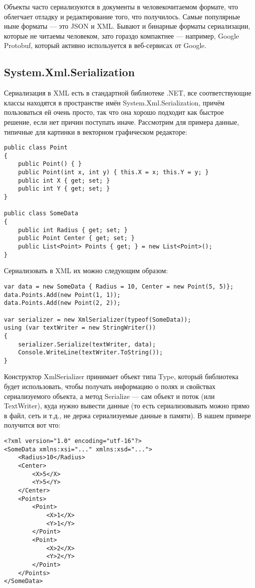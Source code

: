 \documentclass[a5paper]{article}
\begin{document}
Объекты часто сериализуются в документы в человекочитаемом формате, что облегчает отладку и редактирование того, что получилось. Самые популярные ныне форматы --- это JSON и XML. Бывают и бинарные форматы сериализации, которые не читаемы человеком, зато гораздо компактнее --- например, Google Protobuf, который активно используется в веб-сервисах от Google.

\subsection{System.Xml.Serialization}

Сериализация в XML есть в стандартной библиотеке .NET, все соответствующие классы находятся в пространстве имён System.Xml.Serialization, причём пользоваться ей очень просто, так что она хорошо подходит как быстрое решение, если нет причин поступать иначе. Рассмотрим для примера данные, типичные для картинки в векторном графическом редакторе:

\begin{verbatim}
public class Point
{
    public Point() { }
    public Point(int x, int y) { this.X = x; this.Y = y; }
    public int X { get; set; }
    public int Y { get; set; }
}

public class SomeData
{
    public int Radius { get; set; }
    public Point Center { get; set; }
    public List<Point> Points { get; } = new List<Point>();
}
\end{verbatim}

Сериализовать в XML их можно следующим образом:

\begin{verbatim}
var data = new SomeData { Radius = 10, Center = new Point(5, 5)};
data.Points.Add(new Point(1, 1));
data.Points.Add(new Point(2, 2));

var serializer = new XmlSerializer(typeof(SomeData));
using (var textWriter = new StringWriter())
{
    serializer.Serialize(textWriter, data);
    Console.WriteLine(textWriter.ToString());
}
\end{verbatim}

Конструктор XmlSerializer принимает объект типа Type, который библиотека будет использовать, чтобы получать информацию о полях и свойствах сериализуемого объекта, а метод Serialize --- сам объект и поток (или TextWriter), куда нужно вывести данные (то есть сериализовывать можно прямо в файл, сеть и т.д., не держа сериализуемые данные в памяти). В нашем примере получится вот что:

\begin{verbatim}
<?xml version="1.0" encoding="utf-16"?>
<SomeData xmlns:xsi="..." xmlns:xsd="...">
    <Radius>10</Radius>
    <Center>
        <X>5</X>
        <Y>5</Y>
    </Center>
    <Points>
        <Point>
            <X>1</X>
            <Y>1</Y>
        </Point>
        <Point>
            <X>2</X>
            <Y>2</Y>
        </Point>
    </Points>
</SomeData>
\end{verbatim}
\end{document}
